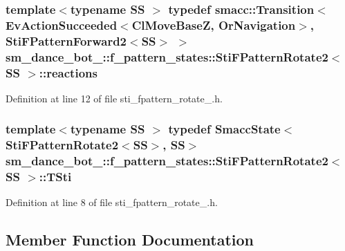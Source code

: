 \subsubsection[{\texorpdfstring{reactions}{reactions}}]{\setlength{\rightskip}{0pt plus 5cm}template$<$typename SS $>$ typedef {\bf smacc\+::\+Transition}$<$Ev\+Action\+Succeeded$<${\bf Cl\+Move\+BaseZ}, {\bf Or\+Navigation}$>$, {\bf Sti\+F\+Pattern\+Forward2}$<$SS$>$ $>$ {\bf sm\+\_\+dance\+\_\+bot\+\_\+::f\+\_\+pattern\+\_\+states\+::\+Sti\+F\+Pattern\+Rotate2}$<$ SS $>$\+::{\bf reactions}}\hypertarget{structsm__dance__bot__3_1_1f__pattern__states_1_1StiFPatternRotate2_a1bbaa0c9baa3589f1a35cf6b5b636088}{}\label{structsm__dance__bot__3_1_1f__pattern__states_1_1StiFPatternRotate2_a1bbaa0c9baa3589f1a35cf6b5b636088}


Definition at line 12 of file sti\+\_\+fpattern\+\_\+rotate\+\_.\+h.

\subsubsection[{\texorpdfstring{T\+Sti}{TSti}}]{\setlength{\rightskip}{0pt plus 5cm}template$<$typename SS $>$ typedef {\bf Smacc\+State}$<${\bf Sti\+F\+Pattern\+Rotate2}$<$SS$>$, SS$>$ {\bf sm\+\_\+dance\+\_\+bot\+\_\+::f\+\_\+pattern\+\_\+states\+::\+Sti\+F\+Pattern\+Rotate2}$<$ SS $>$\+::{\bf T\+Sti}}\hypertarget{structsm__dance__bot__3_1_1f__pattern__states_1_1StiFPatternRotate2_ac6ec0fea1b67d7ad876b9ca5884604e6}{}\label{structsm__dance__bot__3_1_1f__pattern__states_1_1StiFPatternRotate2_ac6ec0fea1b67d7ad876b9ca5884604e6}


Definition at line 8 of file sti\+\_\+fpattern\+\_\+rotate\+\_.\+h.



\subsection{Member Function Documentation}
